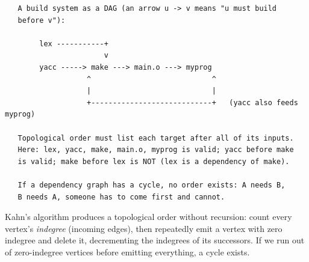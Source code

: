 \begin{verbatim}
   A build system as a DAG (an arrow u -> v means "u must build
   before v"):

        lex -----------+
                       v
        yacc -----> make ---> main.o ---> myprog
                   ^                            ^
                   |                            |
                   +----------------------------+   (yacc also feeds myprog)

   Topological order must list each target after all of its inputs.
   Here: lex, yacc, make, main.o, myprog is valid; yacc before make
   is valid; make before lex is NOT (lex is a dependency of make).

   If a dependency graph has a cycle, no order exists: A needs B,
   B needs A, someone has to come first and cannot.
\end{verbatim}

Kahn's algorithm produces a topological order without recursion: count
every vertex's \emph{indegree} (incoming edges), then repeatedly emit a
vertex with zero indegree and delete it, decrementing the indegrees of
its successors. If we run out of zero-indegree vertices before emitting
everything, a cycle exists.

